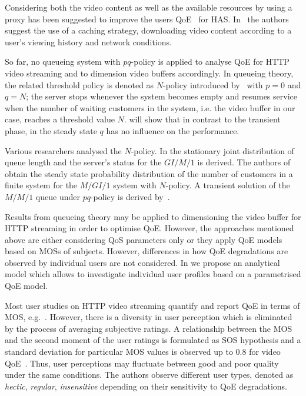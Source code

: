 Considering both the video content as well as the available resources by using a proxy has been suggested to improve the users \gls{QoE}~\cite{Essaili2013} for \gls{HAS}.
In~\cite{Xin2012} the authors suggest the use of a caching strategy, downloading video content according to a user's viewing history and network conditions.

So far, no queueing system with \(pq\)-policy is applied to analyse \gls{QoE} for \gls{HTTP} video streaming and to dimension video buffers accordingly.
In queueing theory, the related threshold policy is denoted as \(N\)-policy introduced by~\cite{Yadin1963} with \(p=0\) and \(q=N\); the server stops whenever the system becomes empty and resumes service when the number of waiting customers in the system, i.e. the video buffer in our case, reaches a threshold value \(N\).
 will show that in  contrast to the transient phase, in the steady state \(q\) has no influence on the performance.

Various researchers analysed the \(N\)-policy.
In \cite{Zhang2004} the stationary joint distribution of queue length and the server's status for the \(GI/M/1\) is derived.
The authors of \cite{Wang2000} obtain the steady state probability distribution of the number of customers in a finite system for the \(M/GI/1\) system with \(N\)-policy.
A transient solution of the \(M/M/1\) queue under \(pq\)-policy is derived by~\cite{Boehm1993}.

Results from queueing theory may be applied to dimensioning the video buffer for \gls{HTTP} streaming in order to optimise \gls{QoE}.
However, the approaches mentioned above are either considering \gls{QoS} parameters only or they apply \gls{QoE} models based on \glspl{MOS} of subjects.
However, differences in how \gls{QoE} degradations are observed by individual users are not considered.
In  we propose an analytical model which allows to investigate individual user profiles based on a parametrised QoE model.

Most user studies on \gls{HTTP} video streaming quantify and report \gls{QoE} in terms of \gls{MOS}, e.g.~\cite{Hossfeld2013c}.
However, there is a diversity in user perception which is eliminated by the process of averaging subjective ratings.
A relationship between the \gls{MOS} and the second moment of the user ratings is formulated as \gls{SOS} hypothesis and a standard deviation for particular \gls{MOS} values is observed up to \(0.8\) for video \gls{QoE}~\cite{Hossfeld2011b}.
Thus, user perceptions may fluctuate between good and poor quality under the same conditions. The authors observe different user types, denoted as \emph{hectic}, \emph{regular}, \emph{insensitive} depending on their sensitivity to \gls{QoE} degradations.

